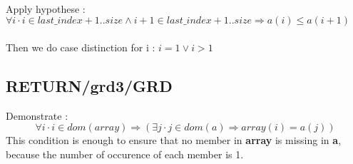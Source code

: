 \paragraph{}
Apply hypothese : \\
$
\forall i \cdot i \in last\_index+1..size \land i+1 \in last\_index+1..size \Rightarrow a(i) \leq a(i+1)
$

\paragraph{}
Then we do case distinction for i : $i=1 \lor i>1$

\subsection{RETURN/grd3/GRD}
Demonstrate : 
$$
\forall i \cdot i \in dom(array) \Rightarrow (\exists j \cdot j \in dom(a) \Rightarrow array(i) = a(j))
$$
This condition is enough to ensure that no member in \textbf{array} is missing in \textbf{a}, because the number of occurence of each member is 1. 














